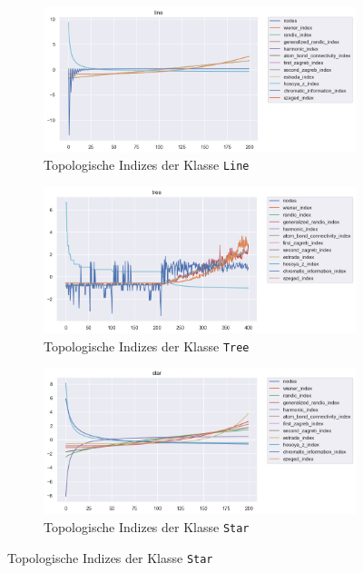 {\begin{minipage}{\textwidth}
\begin{figure}[H]
            \begin{subfigure}{.45\textwidth}
                \includegraphics[width=\textwidth]{images/30_results/line-ti-comparison.png}
                \caption{Topologische Indizes der Klasse \texttt{Line}}
                \label{fig:ti-comparison-line}
            \end{subfigure}%
            \hspace*{\fill}
            \begin{subfigure}{.45\textwidth}
                \includegraphics[width=\textwidth]{images/30_results/tree-ti-comparison.png}
                \caption{Topologische Indizes der Klasse \texttt{Tree}}
                \label{fig:ti-comparison-tree}
            \end{subfigure}

            \center
            \begin{subfigure}{.45\textwidth}
                \includegraphics[width=\textwidth]{images/30_results/star-ti-comparison.png}
                \caption{Topologische Indizes der Klasse \texttt{Star}}
                \label{fig:ti-comparison-star}
            \end{subfigure}
        \end{figure}
    \end{minipage}}

